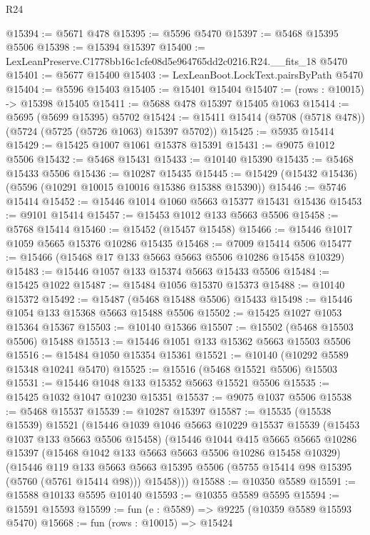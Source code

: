 \begin{lexlean}{R24}
\begin{coremodule}
@15394 := @5671 @478
@15395 := @5596 @5470
@15397 := @5468 @15395 @5506
@15398 := @15394 @15397
@15400 := LexLeanPreserve.C1778bb16c1cfe08d5e964765dd2c0216.R24.__fits_18 @5470
@15401 := @5677 @15400
@15403 := LexLeanBoot.LockText.pairsByPath @5470
@15404 := @5596 @15403
@15405 := @15401 @15404
@15407 := (rows : @10015) -> @15398 @15405
@15411 := @5688 @478 @15397 @15405 @1063
@15414 := @5695 (@5699 @15395) @5702
@15424 := @15411 @15414 (@5708 (@5718 @478)) (@5724 (@5725 (@5726 @1063) @15397 @5702))
@15425 := @5935 @15414
@15429 := @15425 @1007 @1061 @15378 @15391
@15431 := @9075 @1012 @5506
@15432 := @5468 @15431
@15433 := @10140 @15390
@15435 := @5468 @15433 @5506
@15436 := @10287 @15435
@15445 := @15429 (@15432 @15436) (@5596 (@10291 @10015 @10016 @15386 @15388 @15390))
@15446 := @5746 @15414
@15452 := @15446 @1014 @1060 @5663 @15377 @15431 @15436
@15453 := @9101 @15414
@15457 := @15453 @1012 @133 @5663 @5506
@15458 := @5768 @15414
@15460 := @15452 (@15457 @15458)
@15466 := @15446 @1017 @1059 @5665 @15376 @10286 @15435
@15468 := @7009 @15414 @506
@15477 := @15466 (@15468 @17 @133 @5663 @5663 @5506 @10286 @15458 @10329)
@15483 := @15446 @1057 @133 @15374 @5663 @15433 @5506
@15484 := @15425 @1022
@15487 := @15484 @1056 @15370 @15373
@15488 := @10140 @15372
@15492 := @15487 (@5468 @15488 @5506) @15433
@15498 := @15446 @1054 @133 @15368 @5663 @15488 @5506
@15502 := @15425 @1027 @1053 @15364 @15367
@15503 := @10140 @15366
@15507 := @15502 (@5468 @15503 @5506) @15488
@15513 := @15446 @1051 @133 @15362 @5663 @15503 @5506
@15516 := @15484 @1050 @15354 @15361
@15521 := @10140 (@10292 @5589 @15348 @10241 @5470)
@15525 := @15516 (@5468 @15521 @5506) @15503
@15531 := @15446 @1048 @133 @15352 @5663 @15521 @5506
@15535 := @15425 @1032 @1047 @10230 @15351
@15537 := @9075 @1037 @5506
@15538 := @5468 @15537
@15539 := @10287 @15397
@15587 := @15535
    (@15538 @15539)
    @15521
    (@15446
      @1039
      @1046
      @5663
      @10229
      @15537
      @15539
      (@15453 @1037 @133 @5663 @5506 @15458)
      (@15446
        @1044
        @415
        @5665
        @5665
        @10286
        @15397
        (@15468 @1042 @133 @5663 @5663 @5506 @10286 @15458 @10329)
        (@15446
          @119
          @133
          @5663
          @5663
          @15395
          @5506
          (@5755 @15414 @98 @15395 (@5760 (@5761 @15414 @98)))
          @15458)))
@15588 := @10350 @5589
@15591 := @15588 @10133 @5595 @10140
@15593 := @10355 @5589 @5595
@15594 := @15591 @15593
@15599 := fun (e : @5589) => @9225 (@10359 @5589 @15593 @5470)
@15668 := fun (rows : @10015) =>
  @15424

\end{coremodule}
\end{lexlean}
